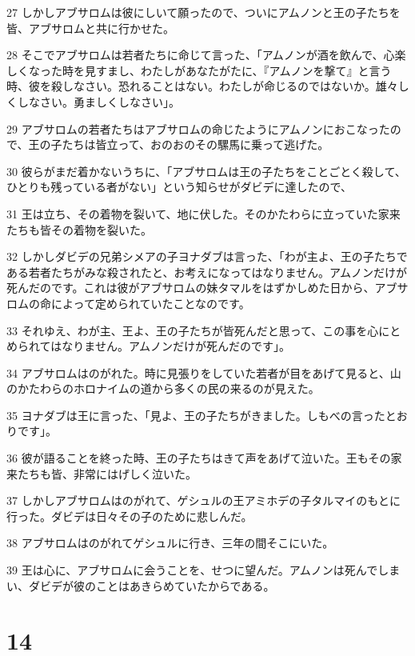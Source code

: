 \par 27 しかしアブサロムは彼にしいて願ったので、ついにアムノンと王の子たちを皆、アブサロムと共に行かせた。
\par 28 そこでアブサロムは若者たちに命じて言った、「アムノンが酒を飲んで、心楽しくなった時を見すまし、わたしがあなたがたに、『アムノンを撃て』と言う時、彼を殺しなさい。恐れることはない。わたしが命じるのではないか。雄々しくしなさい。勇ましくしなさい」。
\par 29 アブサロムの若者たちはアブサロムの命じたようにアムノンにおこなったので、王の子たちは皆立って、おのおのその騾馬に乗って逃げた。
\par 30 彼らがまだ着かないうちに、「アブサロムは王の子たちをことごとく殺して、ひとりも残っている者がない」という知らせがダビデに達したので、
\par 31 王は立ち、その着物を裂いて、地に伏した。そのかたわらに立っていた家来たちも皆その着物を裂いた。
\par 32 しかしダビデの兄弟シメアの子ヨナダブは言った、「わが主よ、王の子たちである若者たちがみな殺されたと、お考えになってはなりません。アムノンだけが死んだのです。これは彼がアブサロムの妹タマルをはずかしめた日から、アブサロムの命によって定められていたことなのです。
\par 33 それゆえ、わが主、王よ、王の子たちが皆死んだと思って、この事を心にとめられてはなりません。アムノンだけが死んだのです」。
\par 34 アブサロムはのがれた。時に見張りをしていた若者が目をあげて見ると、山のかたわらのホロナイムの道から多くの民の来るのが見えた。
\par 35 ヨナダブは王に言った、「見よ、王の子たちがきました。しもべの言ったとおりです」。
\par 36 彼が語ることを終った時、王の子たちはきて声をあげて泣いた。王もその家来たちも皆、非常にはげしく泣いた。
\par 37 しかしアブサロムはのがれて、ゲシュルの王アミホデの子タルマイのもとに行った。ダビデは日々その子のために悲しんだ。
\par 38 アブサロムはのがれてゲシュルに行き、三年の間そこにいた。
\par 39 王は心に、アブサロムに会うことを、せつに望んだ。アムノンは死んでしまい、ダビデが彼のことはあきらめていたからである。

\chapter{14}


